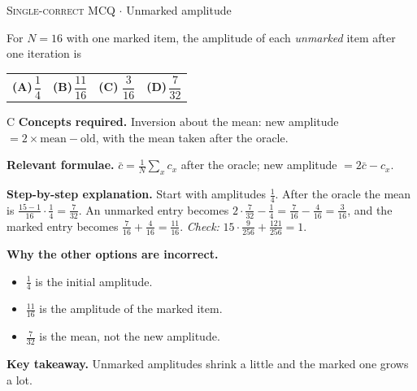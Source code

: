 \documentclass[11pt,a4paper]{article}
\newcommand{\optlabel}[1]{\textbf{(#1)}}
\newcommand{\correctlabel}[1]{\textcolor{okgreen}{\textbf{(#1)}\,\ding{51}}}
\newenvironment{qitem}[1]{\begin{list}{}{\setlength{\leftmargin}{3.3em}\setlength{\labelwidth}{3.1em}%
  \setlength{\labelsep}{0.2em}\setlength{\topsep}{3pt}\setlength{\parsep}{3pt}}\item[\textbf{Q.#1}\hfill]}{\end{list}}
\newcommand{\qsep}{\par\vspace{2pt}{\color{black!15}\hrule}\vspace{4pt}}
\newcommand{\qmeta}[2]{{\footnotesize\color{black!60}\textsc{#1} \;$\cdot$\; #2}\par}
\begin{document}
\begin{qitem}{48}
\qmeta{Single-correct MCQ}{Unmarked amplitude}
For $N = 16$ with one marked item, the amplitude of each \emph{unmarked} item after one iteration is
\par\smallskip\noindent\begin{tabularx}{\linewidth}{@{}*{4}{L}@{}}
\optlabel{A}\,$\dfrac14$ & \optlabel{B}\,$\dfrac{11}{16}$ & \correctlabel{C}\,$\dfrac{3}{16}$ & \optlabel{D}\,$\dfrac{7}{32}$
\end{tabularx}
\end{qitem}
\begin{solbox}{C}
\textbf{\color{brand}Concepts required.} Inversion about the mean: new amplitude $= 2\times\text{mean} - \text{old}$, with the mean taken after the oracle.

\textbf{\color{brand}Relevant formulae.} $\bar c = \frac1N\sum_xc_x$ after the oracle; new amplitude $= 2\bar c - c_x$.

\textbf{\color{brand}Step-by-step explanation.} Start with amplitudes $\frac14$. After the oracle the mean is $\frac{15 - 1}{16}\cdot\frac14 = \frac{7}{32}$. An unmarked entry becomes $2\cdot\frac{7}{32} - \frac14 = \frac{7}{16} - \frac{4}{16} = \frac{3}{16}$,
and the marked entry becomes $\frac{7}{16} + \frac{4}{16} = \frac{11}{16}$. \emph{Check:} $15\cdot\frac{9}{256} + \frac{121}{256} = 1$.

\textbf{\color{brand}Why the other options are incorrect.}
\begin{itemize}[leftmargin=2.4em, itemsep=1pt, topsep=2pt]
\item[\textbf{(A)}] $\frac14$ is the initial amplitude.
\item[\textbf{(B)}] $\frac{11}{16}$ is the amplitude of the marked item.
\item[\textbf{(D)}] $\frac{7}{32}$ is the mean, not the new amplitude.
\end{itemize}
\textbf{\color{brand}Key takeaway.} Unmarked amplitudes shrink a little and the marked one grows a lot.
\end{solbox}
\qsep
\end{document}
